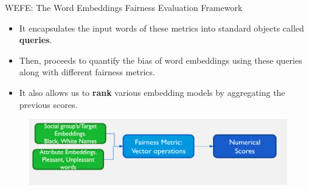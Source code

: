 \documentclass[handout]{beamer}
\begin{document}
\begin{frame}{WEFE: The Word Embeddings Fairness Evaluation Framework}
\begin{scriptsize}
\begin{itemize}

 \item It encapsulates the input words of these metrics into standard objects called \textbf{queries}.
 \item Then, proceeds to quantify the bias of word embeddings using these queries along with different fairness metrics.
 \item It also allows us to \textbf{rank} various embedding models by aggregating the previous scores.
\end{itemize}
  \begin{figure}[h]
        	\includegraphics[scale = 0.3]{pics/wefe.png}
        \end{figure}

\end{scriptsize}
\end{frame}
\end{document}
